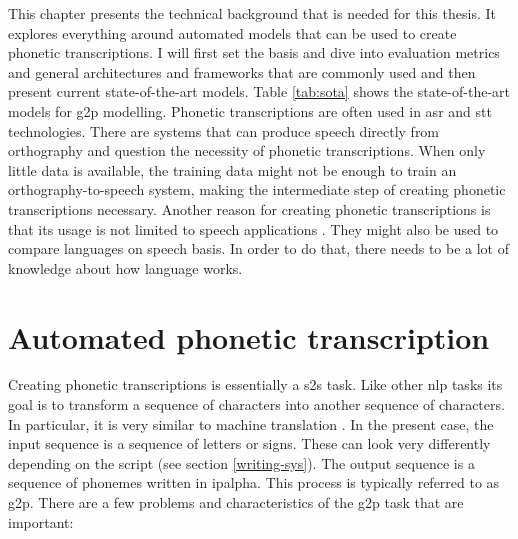 \label{chap:tech-background}
This chapter presents the technical background that is needed for this thesis. It explores everything around automated models that can be used to create phonetic transcriptions. I will first set the basis and dive into evaluation metrics and general architectures and frameworks that are commonly used and then present current state-of-the-art models. Table \ref{tab:sota} shows the state-of-the-art models for \ac{g2p} modelling. Phonetic transcriptions are often used in \ac{asr} and \ac{stt} technologies. There are systems that can produce speech directly from orthography and question the necessity of phonetic transcriptions. When only  little data is available, the training data might not be enough to train an orthography-to-speech system, making the intermediate step of creating phonetic transcriptions necessary. Another reason for creating phonetic transcriptions is that its usage is not limited to speech applications \citep{mortensen-etal-2018-epitran}. They might also be used to compare languages on speech basis. In order to do that, there needs to be a lot of knowledge about how language works. 

\section{Automated phonetic transcription}
\label{model_theory}
Creating phonetic transcriptions is essentially a \acf{s2s} task. Like other \ac{nlp} tasks its goal is to transform a sequence of characters into another sequence of characters. In particular, it is very similar to machine translation \citep{Rao2015GraphemetophonemeCU}. In the present case, the input sequence is a sequence of letters or signs. These can look very differently depending on the script (see section \ref{writing-sys}). The output sequence is a sequence of phonemes written in \ac{ipalpha}. This process is typically referred to as \acf{g2p}. There are a few problems and characteristics of the \ac{g2p} task that are important:

